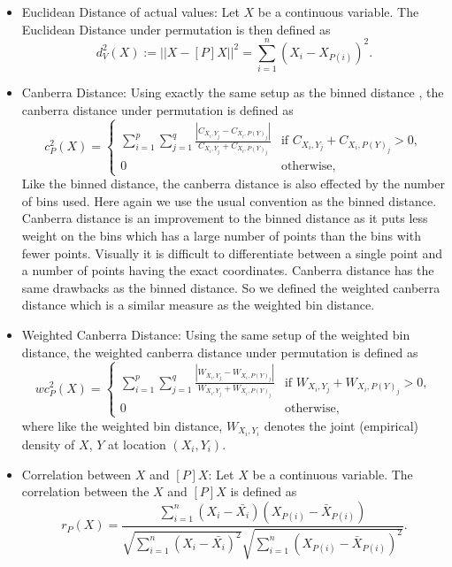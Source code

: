 \documentclass[12]{report}
\begin{document}
\begin{itemize}

\item Euclidean Distance of actual values: 
Let $X$ be a continuous variable. The Euclidean Distance under permutation is then defined as 
\[
d^2_V(X) := || X - [P]X||^2 = \sum_{i=1}^n (X_i - X_{P(i)})^2.
\]



\item Canberra Distance: Using exactly the same setup as the binned distance , the canberra distance under permutation is defined as
\[
c^2_P(X)  = \left \{ 
\begin{array}{ll}
\sum_{i=1}^p \sum_{j=1}^q \frac{ |C_{X_i,Y_j} - C_{X_i,P(Y)_j}|}{ C_{X_i,Y_j} + C_{X_i,P(Y)_j}} & \text{if } C_{X_i,Y_j} + C_{X_i,P(Y)_j} > 0,\\
0 & \text{otherwise},
\end{array} \right.
\]
Like the binned distance, the canberra distance is also effected by the number of bins used. Here again we use the usual convention as the binned distance. Canberra distance is an improvement to the binned distance as it puts less weight on the bins which has a large number of points than the bins with fewer points. Visually it is difficult to differentiate between a single point and a number of points having the exact coordinates. Canberra distance has the same drawbacks as the binned distance. So we defined the weighted canberra distance which is a similar measure as the weighted bin distance.

\item Weighted Canberra Distance:  Using the same setup of the weighted bin distance, the weighted canberra distance under permutation is defined as 
\[
wc_P^2(X) = \left \{ 
\begin{array}{ll}
\sum_{i=1}^p \sum_{j=1}^q \frac{ |W_{X_i,Y_j} - W_{X_i,P(Y)_j}|}{ W_{X_i,Y_j} + W_{X_i,P(Y)_j}} & \text{if } W_{X_i,Y_j} + W_{X_i,P(Y)_j} > 0,\\
0 & \text{otherwise},
\end{array} \right.
\] 
where like the weighted bin distance, $W_{X_i,Y_i}$ denotes the joint (empirical) density of $X$, $Y$ at location $(X_i, Y_i)$. 

\item Correlation between $X$ and $[P]X$: Let $X$ be a continuous variable. The correlation between the $X$ and $[P]X$ is defined as
\[
r_P(X) = \frac{ \sum_{i=1}^n (X_i - \bar{X_i})(X_{P(i)} - \bar{X}_{P(i)})}{\sqrt{\sum_{i=1}^n (X_i - \bar{X_i})^2}\sqrt{\sum_{i=1}^n (X_{P(i)}- \bar{X}_{P(i)})^2}}.
\]


\end{itemize}
\end{document}
